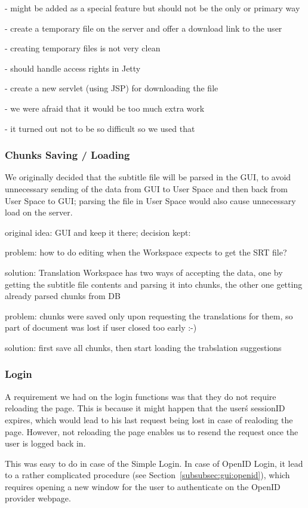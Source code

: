   - might be added as a special feature but should not be the only or primary way

- create a temporary file on the server and offer a download link to the user

  - creating temporary files is not very clean
  
  - should handle access rights in Jetty

- create a new servlet (using JSP) for downloading the file

  - we were afraid that it would be too much extra work
  
  - it turned out not to be so difficult so we used that

\subsubsection{Chunks Saving / Loading}

We originally decided that the subtitle file will be parsed in the GUI, 
to avoid unnecessary sending of the data from GUI to User Space and then back from User Space to GUI; parsing the file in User Space would also cause unnecessary load on the server.

original idea: GUI and keep it there; decision kept: 

problem: how to do editing when the Workspace expects to get the SRT file?

solution: Translation Workspace has two ways of accepting the data, one by getting the subtitle file contents and parsing it into chunks, the other one getting already parsed chunks from DB


problem: chunks were saved only upon requesting the translations for them, so part of document was lost if user closed too early :-)

solution: first save all chunks, then start loading the trabslation suggestions


\subsubsection{Login}

A requirement we had on the login functions was that they do not require reloading the page. This is because it might happen that the user\'s sessionID expires, which would lead to his last request being lost in case of realoding the page. However, not reloading the page enables us to resend the request once the user is logged back in.

This was easy to do in case of the Simple Login. In case of OpenID Login, it lead to a rather complicated procedure (see Section~\ref{subsubsec:gui:openid}), which requires opening a new window for the user to authenticate on the OpenID provider webpage.

